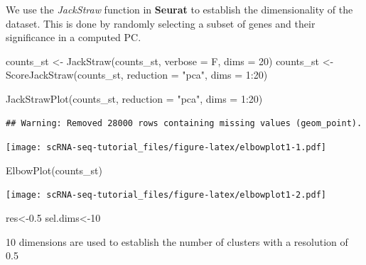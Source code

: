 \documentclass[
]{book}
\newenvironment{Shaded}{\begin{snugshade}}{\end{snugshade}}
\newcommand{\AttributeTok}[1]{\textcolor[rgb]{0.77,0.63,0.00}{#1}}
\newcommand{\DecValTok}[1]{\textcolor[rgb]{0.00,0.00,0.81}{#1}}
\newcommand{\FloatTok}[1]{\textcolor[rgb]{0.00,0.00,0.81}{#1}}
\newcommand{\FunctionTok}[1]{\textcolor[rgb]{0.00,0.00,0.00}{#1}}
\newcommand{\NormalTok}[1]{#1}
\newcommand{\OtherTok}[1]{\textcolor[rgb]{0.56,0.35,0.01}{#1}}
\newcommand{\SpecialCharTok}[1]{\textcolor[rgb]{0.00,0.00,0.00}{#1}}
\newcommand{\StringTok}[1]{\textcolor[rgb]{0.31,0.60,0.02}{#1}}
\begin{document}
We use the \emph{JackStraw} function in \textbf{Seurat} to establish the dimensionality of the dataset. This is done by randomly selecting a subset of genes and their significance in a computed PC.

\begin{Shaded}
\begin{Highlighting}[]
\NormalTok{counts\_st }\OtherTok{\textless{}{-}} \FunctionTok{JackStraw}\NormalTok{(counts\_st, }\AttributeTok{verbose =}\NormalTok{ F, }\AttributeTok{dims =} \DecValTok{20}\NormalTok{)}
\NormalTok{counts\_st }\OtherTok{\textless{}{-}}
  \FunctionTok{ScoreJackStraw}\NormalTok{(counts\_st, }\AttributeTok{reduction =} \StringTok{"pca"}\NormalTok{, }\AttributeTok{dims =} \DecValTok{1}\SpecialCharTok{:}\DecValTok{20}\NormalTok{)}
\end{Highlighting}
\end{Shaded}

\begin{Shaded}
\begin{Highlighting}[]
\FunctionTok{JackStrawPlot}\NormalTok{(counts\_st, }\AttributeTok{reduction =} \StringTok{"pca"}\NormalTok{, }\AttributeTok{dims =} \DecValTok{1}\SpecialCharTok{:}\DecValTok{20}\NormalTok{)}
\end{Highlighting}
\end{Shaded}

\begin{verbatim}
## Warning: Removed 28000 rows containing missing values (geom_point).
\end{verbatim}

\texttt{[image: scRNA-seq-tutorial\_files/figure-latex/elbowplot1-1.pdf]}

\begin{Shaded}
\begin{Highlighting}[]
\FunctionTok{ElbowPlot}\NormalTok{(counts\_st)}
\end{Highlighting}
\end{Shaded}

\texttt{[image: scRNA-seq-tutorial\_files/figure-latex/elbowplot1-2.pdf]}

\begin{Shaded}
\begin{Highlighting}[]
\NormalTok{res}\OtherTok{\textless{}{-}}\FloatTok{0.5}
\NormalTok{sel.dims}\OtherTok{\textless{}{-}}\DecValTok{10}
\end{Highlighting}
\end{Shaded}

10 dimensions are used to establish the number of clusters with a resolution of 0.5
\end{document}
